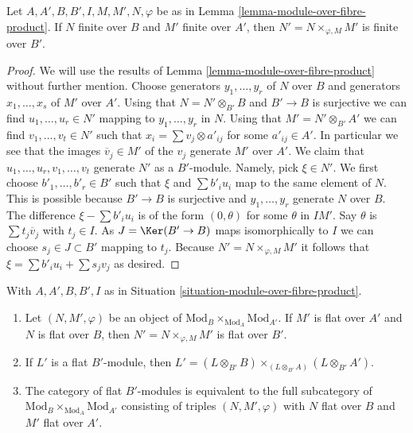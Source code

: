 \begin{lemma}
\label{lemma-finite-module-over-fibre-product}
Let $A, A', B, B', I, M, M', N, \varphi$ be as in
Lemma \ref{lemma-module-over-fibre-product}.
If $N$ finite over $B$ and $M'$ finite over $A'$, then
$N' = N \times_{\varphi, M} M'$ is finite over $B'$.
\end{lemma}

\begin{proof}
We will use the results of
Lemma \ref{lemma-module-over-fibre-product}
without further mention. Choose generators $y_1, \ldots, y_r$ of $N$ over $B$
and generators $x_1, \ldots, x_s$ of $M'$ over $A'$. Using that
$N = N' \otimes_{B'} B$ and $B' \to B$ is surjective we can find
$u_1, \ldots, u_r \in N'$ mapping to $y_1, \ldots, y_r$ in $N$.
Using that $M' = N' \otimes_{B'} A'$ we can find $v_1, \ldots, v_t \in N'$
such that $x_i = \sum v_j \otimes a'_{ij}$ for some $a'_{ij} \in A'$.
In particular we see that the images $\overline{v}_j \in M'$
of the $v_j$ generate $M'$ over $A'$.
We claim that $u_1, \ldots, u_r, v_1, \ldots, v_t$
generate $N'$ as a $B'$-module. Namely, pick $\xi \in N'$. We first choose
$b'_1, \ldots, b'_r \in B'$ such that $\xi$ and $\sum b'_i u_i$ map
to the same element of $N$. This is possible because $B' \to B$
is surjective and $y_1, \ldots, y_r$ generate $N$ over $B$.
The difference $\xi - \sum b'_i u_i$ is of the form $(0, \theta)$
for some $\theta$ in $IM'$. Say $\theta$ is $\sum t_j\overline{v}_j$
with $t_j \in I$. As $J = \Ker(B' \to B)$ maps isomorphically to $I$
we can choose $s_j \in J \subset B'$ mapping to $t_j$.
Because $N' = N \times_{\varphi, M} M'$ it follows
that $\xi = \sum b'_i u_i + \sum s_j v_j$ as desired.
\end{proof}

\begin{lemma}
\label{lemma-flat-module-over-fibre-product}
With $A, A', B, B', I$ as in
Situation \ref{situation-module-over-fibre-product}.
\begin{enumerate}
\item Let $(N, M', \varphi)$ be an object of
$\text{Mod}_B \times_{\text{Mod}_A} \text{Mod}_{A'}$.
If $M'$ is flat over $A'$ and $N$ is flat over $B$, then
$N' = N \times_{\varphi, M} M'$ is flat over $B'$.
\item If $L'$ is a flat $B'$-module, then
$L' = (L \otimes_{B'} B) \times_{(L \otimes_{B'} A)} (L \otimes_{B'} A')$.
\item The category of flat $B'$-modules is equivalent to the
full subcategory of $\text{Mod}_B \times_{\text{Mod}_A} \text{Mod}_{A'}$
consisting of triples
$(N, M', \varphi)$ with $N$ flat over $B$ and $M'$ flat over $A'$.
\end{enumerate}
\end{lemma}

